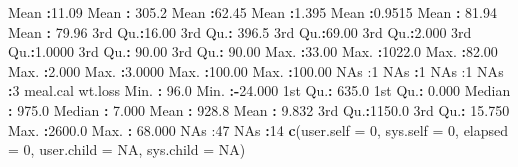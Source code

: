 \documentclass[
]{article}
\newenvironment{Shaded}{\begin{snugshade}}{\end{snugshade}}
\newcommand{\AttributeTok}[1]{\textcolor[rgb]{0.13,0.29,0.53}{#1}}
\newcommand{\ConstantTok}[1]{\textcolor[rgb]{0.56,0.35,0.01}{#1}}
\newcommand{\DecValTok}[1]{\textcolor[rgb]{0.00,0.00,0.81}{#1}}
\newcommand{\FloatTok}[1]{\textcolor[rgb]{0.00,0.00,0.81}{#1}}
\newcommand{\FunctionTok}[1]{\textcolor[rgb]{0.13,0.29,0.53}{\textbf{#1}}}
\newcommand{\NormalTok}[1]{#1}
\newcommand{\SpecialCharTok}[1]{\textcolor[rgb]{0.81,0.36,0.00}{\textbf{#1}}}
\newcommand{\StringTok}[1]{\textcolor[rgb]{0.31,0.60,0.02}{#1}}
\begin{document}
\begin{Shaded}
\begin{Highlighting}[]
\NormalTok{ Mean   }\SpecialCharTok{:}\FloatTok{11.09}\NormalTok{   Mean   }\SpecialCharTok{:} \FloatTok{305.2}\NormalTok{   Mean   }\SpecialCharTok{:}\FloatTok{62.45}\NormalTok{   Mean   }\SpecialCharTok{:}\FloatTok{1.395}\NormalTok{   Mean   }\SpecialCharTok{:}\FloatTok{0.9515}\NormalTok{   Mean   }\SpecialCharTok{:} \FloatTok{81.94}\NormalTok{   Mean   }\SpecialCharTok{:} \FloatTok{79.96}  
\NormalTok{ 3rd Qu.}\SpecialCharTok{:}\FloatTok{16.00}\NormalTok{   3rd Qu.}\SpecialCharTok{:} \FloatTok{396.5}\NormalTok{   3rd Qu.}\SpecialCharTok{:}\FloatTok{69.00}\NormalTok{   3rd Qu.}\SpecialCharTok{:}\FloatTok{2.000}\NormalTok{   3rd Qu.}\SpecialCharTok{:}\FloatTok{1.0000}\NormalTok{   3rd Qu.}\SpecialCharTok{:} \FloatTok{90.00}\NormalTok{   3rd Qu.}\SpecialCharTok{:} \FloatTok{90.00}  
\NormalTok{ Max.   }\SpecialCharTok{:}\FloatTok{33.00}\NormalTok{   Max.   }\SpecialCharTok{:}\FloatTok{1022.0}\NormalTok{   Max.   }\SpecialCharTok{:}\FloatTok{82.00}\NormalTok{   Max.   }\SpecialCharTok{:}\FloatTok{2.000}\NormalTok{   Max.   }\SpecialCharTok{:}\FloatTok{3.0000}\NormalTok{   Max.   }\SpecialCharTok{:}\FloatTok{100.00}\NormalTok{   Max.   }\SpecialCharTok{:}\FloatTok{100.00}  
\NormalTok{ NA}\StringTok{\textquotesingle{}s   :1                                                        NA\textquotesingle{}}\NormalTok{s   }\SpecialCharTok{:}\DecValTok{1}\NormalTok{        NA}\StringTok{\textquotesingle{}s   :1        NA\textquotesingle{}}\NormalTok{s   }\SpecialCharTok{:}\DecValTok{3}       
\NormalTok{    meal.cal         wt.loss       }
\NormalTok{ Min.   }\SpecialCharTok{:}  \FloatTok{96.0}\NormalTok{   Min.   }\SpecialCharTok{:{-}}\FloatTok{24.000}  
\NormalTok{ 1st Qu.}\SpecialCharTok{:} \FloatTok{635.0}\NormalTok{   1st Qu.}\SpecialCharTok{:}  \FloatTok{0.000}  
\NormalTok{ Median }\SpecialCharTok{:} \FloatTok{975.0}\NormalTok{   Median }\SpecialCharTok{:}  \FloatTok{7.000}  
\NormalTok{ Mean   }\SpecialCharTok{:} \FloatTok{928.8}\NormalTok{   Mean   }\SpecialCharTok{:}  \FloatTok{9.832}  
\NormalTok{ 3rd Qu.}\SpecialCharTok{:}\FloatTok{1150.0}\NormalTok{   3rd Qu.}\SpecialCharTok{:} \FloatTok{15.750}  
\NormalTok{ Max.   }\SpecialCharTok{:}\FloatTok{2600.0}\NormalTok{   Max.   }\SpecialCharTok{:} \FloatTok{68.000}  
\NormalTok{ NA}\StringTok{\textquotesingle{}s   :47       NA\textquotesingle{}}\NormalTok{s   }\SpecialCharTok{:}\DecValTok{14}       
\FunctionTok{c}\NormalTok{(}\AttributeTok{user.self =} \DecValTok{0}\NormalTok{, }\AttributeTok{sys.self =} \DecValTok{0}\NormalTok{, }\AttributeTok{elapsed =} \DecValTok{0}\NormalTok{, }\AttributeTok{user.child =} \ConstantTok{NA}\NormalTok{,  }\AttributeTok{sys.child =} \ConstantTok{NA}\NormalTok{) }
\end{Highlighting}
\end{Shaded}
\end{document}
